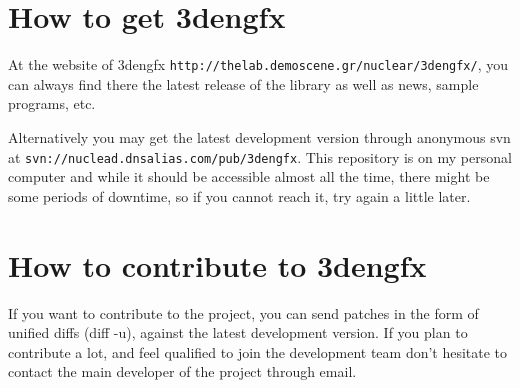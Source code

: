 \section{How to get 3dengfx}

At the website of 3dengfx \verb|http://thelab.demoscene.gr/nuclear/3dengfx/|,
you can always find there the latest release of the library as well as news,
sample programs, etc.

Alternatively you may get the latest development version through anonymous svn
at \verb|svn://nuclead.dnsalias.com/pub/3dengfx|. This repository is on my
personal computer and while it should be accessible almost all the time, there
might be some periods of downtime, so if you cannot reach it, try again a little
later.

\section{How to contribute to 3dengfx}

If you want to contribute to the project, you can send patches in the form of
unified diffs (diff -u), against the latest development version. If you plan to
contribute a lot, and feel qualified to join the development team don't hesitate
to contact the main developer of the project through email.
